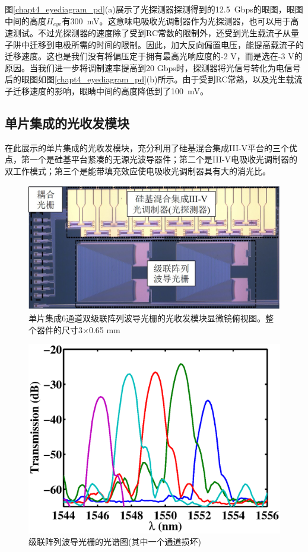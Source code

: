 图\ref{chapt4_eyediagram_pd}(a)展示了光探测器探测得到的12.5~Gbps的眼图，眼图中间的高度$H_{eye}$有300~mV。这意味电吸收光调制器作为光探测器，也可以用于高速测试。不过光探测器的速度除了受到RC常数的限制外，还受到光生载流子从量子阱中迁移到电极所需的时间的限制。因此，加大反向偏置电压，能提高载流子的迁移速度。这也是我们没有将偏压定于拥有最高光响应度的-2 V，而是选在-3 V的原因。当我们进一步将调制速率提高到20 Gbps时，探测器将光信号转化为电信号后的眼图如图\ref{chapt4_eyediagram_pd}(b)所示。由于受到RC常熟，以及光生载流子迁移速度的影响，眼睛中间的高度降低到了100~mV。

\subsection{单片集成的光收发模块}
在此展示的单片集成的光收发模块，充分利用了硅基混合集成III-V平台的三个优点，第一个是硅基平台紧凑的无源光波导器件；第二个是III-V电吸收光调制器的双工作模式；第三个是能带填充效应使电吸收光调制器具有大的消光比。
\begin{figure}[htb]
	\centering
	\includegraphics[width=12cm]{./Pictures/chapt4_casacade_awg_structure.jpg}
	\caption{单片集成6通道双级联阵列波导光栅的光收发模块显微镜俯视图。整个器件的尺寸3$\times$0.65 mm}
	\label{chapt4_casacade_awg_structure}
\end{figure}
\begin{figure}[htb]
	\centering
	\includegraphics[width=12cm]{./Pictures/chapt4_cascade_awg_spectra.eps}
	\caption{级联阵列波导光栅的光谱图(其中一个通道损坏)}
	\label{chapt4_cascade_awg_spectra}
\end{figure}

